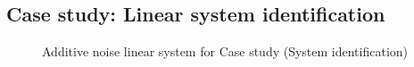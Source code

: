 \subsection{Case study: Linear system identification}
\begin{figure}
  \centering
  \caption{Additive noise linear system for  Case study (System identification)\label{fig:addnoise_LTI}}
\end{figure}

